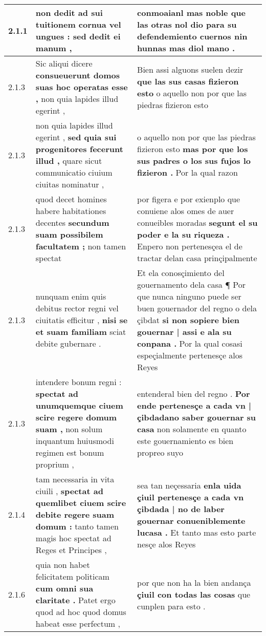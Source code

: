 \begin{tabular}{|p{1cm}|p{6.5cm}|p{6.5cm}|}
2.1.1 & non dedit \textbf{ ad sui tuitionem cornua vel ungues : } sed dedit ei manum , & conmoaianl mas noble que las otras nol dio \textbf{ para su defendemiento cuernos } nin hunnas mas diol mano . \\\hline
2.1.3 & Sic aliqui dicere \textbf{ consueuerunt domos suas hoc operatas esse , } non quia lapides illud egerint , & Bien assi alguons suelen dezir \textbf{ que las sus casas fizieron esto } o aquello non por que las piedras fizieron esto \\\hline
2.1.3 & non quia lapides illud egerint , \textbf{ sed quia sui progenitores fecerunt illud , } quare sicut communicatio ciuium ciuitas nominatur , & o aquello non por que las piedras fizieron esto \textbf{ mas por que los sus padres o los sus fujos lo fizieron . } Por la qual razon \\\hline
2.1.3 & quod decet homines habere habitationes decentes \textbf{ secundum suam possibilem facultatem ; } non tamen spectat & por figera e por exienplo que conuiene alos omes de auer conueibles moradas \textbf{ segunt el su poder e la su riqueza . } Enpero non pertenesçea el de tractar delan casa prinçipalmente \\\hline
2.1.3 & nunquam enim quis debitus rector regni vel ciuitatis efficitur , \textbf{ nisi se et suam familiam } sciat debite gubernare . & Et ela conosçimiento del gouernamento dela casa ¶ Por que nunca ninguno puede ser buen gouernador del regno o dela çibdat \textbf{ si non sopiere bien gouernar | assi e ala su conpana . } Por la qual cosasi espeçialmente pertenesçe alos Reyes \\\hline
2.1.3 & intendere bonum regni : \textbf{ spectat ad unumquemque ciuem scire regere domum suam , } non solum inquantum huiusmodi regimen est bonum proprium , & entenderal bien del regno . \textbf{ Por ende pertenesçe a cada vn | çibdadano saber gouernar su casa } non solamente en quanto este gouernamiento es bien propreo suyo \\\hline
2.1.4 & tam necessaria in vita ciuili , \textbf{ spectat ad quemlibet ciuem scire debite regere suam domum : } tanto tamen magis hoc spectat ad Reges et Principes , & sea tan neçessaria \textbf{ enla uida çiuil pertenesçe a cada vn çibdada | no de laber gouernar conueniblemente lucasa . } Et tanto mas esto parte nesçe alos Reyes \\\hline
2.1.6 & quia non habet felicitatem politicam \textbf{ cum omni sua claritate . } Patet ergo quod ad hoc quod domus habeat esse perfectum , & por que non ha la bien andança \textbf{ çiuil con todas las cosas } que cunplen para esto . \\\hline

\end{tabular}
